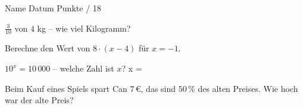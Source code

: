 \documentclass[11pt]{article}
\begin{document}
{}
\par\vspace{2pt}\noindent Name \underline{\hspace{7cm}}\hfill Datum \underline{\hspace{3cm}}\hfill Punkte \underline{\hspace{1.2cm}} / 18\par\vspace{6pt}
\small

\noindent\begin{minipage}[t]{0.485\linewidth}\raggedright
\begin{aufgabe}{$\frac{3}{10}$ von $4$ kg – wie viel Kilogramm? \leerfeld[kg]}
\end{aufgabe}
\end{minipage}\hfill\begin{minipage}[t]{0.485\linewidth}\raggedright
\begin{aufgabe}{Berechne den Wert von $8 \cdot (x - 4)$ für $x = -1$. \leerfeld}
\end{aufgabe}
\end{minipage}\par

\noindent\begin{minipage}[t]{0.485\linewidth}\raggedright
\begin{aufgabe}{$10^x = 10\,000$ – welche Zahl ist $x$? x = \leerfeld}
\end{aufgabe}
\end{minipage}\hfill\begin{minipage}[t]{0.485\linewidth}\raggedright
\begin{aufgabe}{Beim Kauf eines Spiels spart Can $7\,€$, das sind $50\,\%$ des alten Preises. Wie hoch war der alte Preis? \leerfeld[€]}
\end{aufgabe}
\end{minipage}\par
\end{document}
